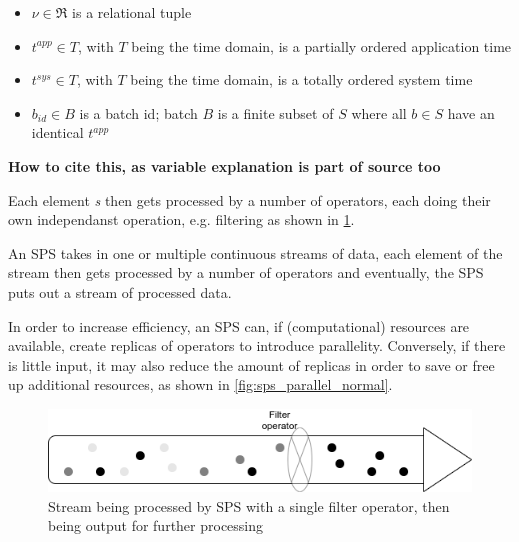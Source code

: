         \begin{itemize}
        \item $\nu \in \mathfrak{R}$ is a relational tuple

        \item $t^{app} \in T$, with $T$ being the time domain, is a partially ordered application time
        
        \item $t^{sys} \in T$,  with $T$ being the time domain, is a totally ordered system time
        
        \item $b_{id} \in B$ is a batch id; batch $B$ is a finite subset of $S$ where all $b \in S$ have an identical $t^{app}$
        \end{itemize}
        \cite{Panigati2015} \textbf{How to cite this, as variable explanation is part of source too}

        Each element \textit{s} then gets processed by a number of operators, each doing their own independanst operation, e.g. filtering as shown in \ref{fig:filter}.

        
        

        


        An SPS takes in one or multiple continuous streams of data, each element of the stream then gets processed by a number of operators and eventually, 
        the SPS puts out a stream of processed data.
    
        In order to increase efficiency, an SPS can, if (computational) resources are available, create replicas of operators to introduce parallelity. 
        Conversely, if there is little input, it may also reduce the amount of replicas in order to save or free up additional resources, as shown in \ref{fig:sps_parallel_normal}.

        \begin{figure}
        \label{fig:filter}
        \centering
        \includegraphics[width=1.0\textwidth]{Bilder/filter.png}
        \caption{
                Stream being processed by SPS with a single filter operator, then being output for further processing
                }
        \end{figure}

